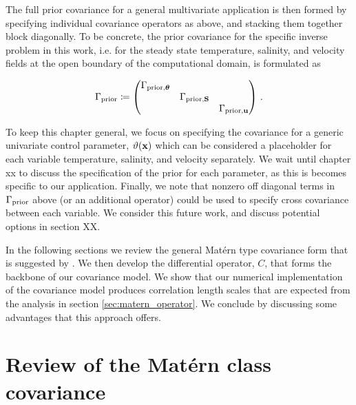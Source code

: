 The full prior covariance for a general multivariate application is then formed
by specifying individual covariance operators as above, and stacking them
together block diagonally.
To be concrete, the prior covariance for the specific inverse problem in this
work, i.e. for the steady state temperature, salinity,
and velocity fields at the open boundary of the computational domain,
is formulated as
\begin{linenomath*}\begin{equation*}
    \Gamma_{\text{prior}} \coloneqq
    \begin{pmatrix}
        \Gamma_{\text{prior,}{\bm{\theta}}} & & \\
        & \Gamma_{\text{prior,}\mathbf{S}} & \\
        & & \Gamma_{\text{prior,}\mathbf{u}} \\
    \end{pmatrix} \, .
\end{equation*}\end{linenomath*}
To keep this chapter general, we focus on specifying the covariance for a generic
univariate control parameter, $\vartheta(\mathbf{x})$ which can be considered a placeholder
for each variable temperature, salinity, and velocity separately.
We wait until
chapter xx to discuss the specification of the prior
for each parameter, as this is becomes specific to our application.
Finally, we note that nonzero off diagonal terms in $\Gamma_{\text{prior}}$ above (or an
additional operator) could be used to specify cross covariance between each
variable.
We consider this future work, and discuss potential options in
section XX.

In the following sections we review the general Mat\'ern type covariance
form that is suggested by \citet{RSSB:RSSB777}.
We then develop the differential operator, $C$, that
forms the backbone of our covariance model.
We show that our numerical implementation of the covariance model produces correlation
length scales that are expected from the analysis in section
\ref{sec:matern_operator}.
We conclude by discussing some advantages that this approach offers.


\section{Review of the Mat\'ern class covariance}
\label{sec:matern_review}


